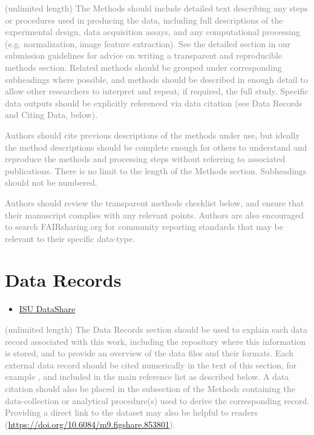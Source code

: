 \documentclass[fleqn,10pt]{wlscirep}
\begin{document}
\textcolor{gray}{(unlimited length) The Methods should include detailed text describing any steps or procedures used in producing the data, including full descriptions of the experimental design, data acquisition assays, and any computational processing (e.g. normalization, image feature extraction). See the detailed section in our submission guidelines for advice on writing a transparent and reproducible methods section. Related methods should be grouped under corresponding subheadings where possible, and methods should be described in enough detail to allow other researchers to interpret and repeat, if required, the full study. Specific data outputs should be explicitly referenced via data citation (see Data Records and Citing Data, below).}

\textcolor{gray}{Authors should cite previous descriptions of the methods under use, but ideally the method descriptions should be complete enough for others to understand and reproduce the methods and processing steps without referring to associated publications. There is no limit to the length of the Methods section. Subheadings should not be numbered.}

\textcolor{gray}{Authors should review the transparent methods checklist below, and ensure that their manuscript complies with any relevant points. Authors are also encouraged to search FAIRsharing.org for community reporting standards that may be relevant to their specific data-type.}

\section*{Data Records}

\begin{itemize}
  \item
  \href{https://iastate.figshare.com/}{ISU DataShare}
\end{itemize}

\textcolor{gray}{(unlimited length) The Data Records section should be used to explain each data record associated with this work, including the repository where this information is stored, and to provide an overview of the data files and their formats. Each external data record should be cited numerically in the text of this section, for example \cite{Hao:gidmaps:2014}, and included in the main reference list as described below. A data citation should also be placed in the subsection of the Methods containing the data-collection or analytical procedure(s) used to derive the corresponding record. Providing a direct link to the dataset may also be helpful to readers (\hyperlink{https://doi.org/10.6084/m9.figshare.853801}{https://doi.org/10.6084/m9.figshare.853801}).}
\end{document}
